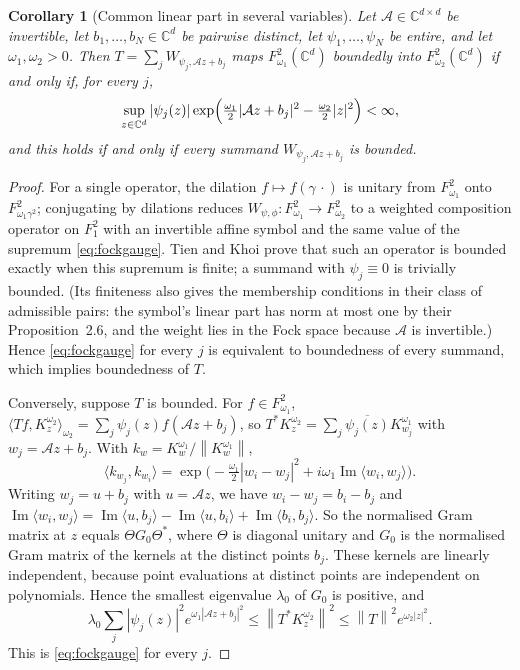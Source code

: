 \documentclass[11pt,a4paper]{article}
\newtheorem{corollary}[theorem]{Corollary}
\theoremstyle{remark}
\newcommand{\C}{\mathbb C}
\newcommand{\norm}[1]{\left\lVert#1\right\rVert}
\newcommand{\im}{\operatorname{Im}}
\begin{document}
\begin{corollary}[Common linear part in several variables]\label{cor:fock}
Let $\mathcal A\in\C^{d\times d}$ be invertible, let $b_1,\dots,b_N\in\C^d$ be
pairwise distinct, let $\psi_1,\dots,\psi_N$ be entire, and let
$\omega_1,\omega_2>0$. Then $T=\sum_jW_{\psi_j,\mathcal Az+b_j}$ maps $F^2_{\omega_1}(\C^d)$
boundedly into $F^2_{\omega_2}(\C^d)$ if and only if, for every $j$,
\begin{equation}\label{eq:fockgauge}
 \sup_{z\in\C^d}|\psi_j(z)|
 \exp\Bigl(\tfrac{\omega_1}{2}|\mathcal Az+b_j|^2-\tfrac{\omega_2}{2}|z|^2\Bigr)<\infty,
\end{equation}
and this holds if and only if every summand $W_{\psi_j,\mathcal Az+b_j}$ is
bounded.
\end{corollary}

\begin{proof}
For a single operator, the dilation $f\mapsto f(\gamma\,\cdot)$ is
unitary from $F^2_{\omega_1}$ onto $F^2_{\omega_1\gamma^2}$; conjugating by
dilations reduces $W_{\psi,\phi}:F^2_{\omega_1}\to F^2_{\omega_2}$ to a weighted
composition operator on $F^2_1$ with an invertible affine symbol and
the same value of the supremum \eqref{eq:fockgauge}. Tien and Khoi
\cite[Corollary~3.10(a)]{TienKhoi2020} prove that such an operator is
bounded exactly when this supremum is finite; a summand with
$\psi_j\equiv0$ is trivially bounded. (Its finiteness also gives
the membership conditions in their class of admissible pairs: the
symbol's linear part has norm at most one by their Proposition~2.6, and
the weight lies in the Fock space because $\mathcal A$ is invertible.) Hence
\eqref{eq:fockgauge} for every $j$ is equivalent to boundedness of every
summand, which implies boundedness of $T$.

Conversely, suppose $T$ is bounded. For $f\in F^2_{\omega_1}$,
$\langle Tf,K^{\omega_2}_z\rangle_{\omega_2}=\sum_j\psi_j(z)f(\mathcal Az+b_j)$, so
$T^*K^{\omega_2}_z=\sum_j\overline{\psi_j(z)}K^{\omega_1}_{w_j}$ with
$w_j=\mathcal Az+b_j$. With $k_w=K^{\omega_1}_w/\norm{K^{\omega_1}_w}$,
\[
 \langle k_{w_j},k_{w_i}\rangle
 =\exp\bigl(-\tfrac{\omega_1}{2}|w_i-w_j|^2+i\omega_1\im\langle w_i,w_j\rangle\bigr).
\]
Writing $w_j=u+b_j$ with $u=\mathcal Az$, we have $w_i-w_j=b_i-b_j$ and
$\im\langle w_i,w_j\rangle=\im\langle u,b_j\rangle-\im\langle u,b_i\rangle
+\im\langle b_i,b_j\rangle$. So the normalised Gram matrix at $z$ equals
$\Theta G_0\Theta^*$, where $\Theta$ is diagonal unitary and $G_0$ is the
normalised Gram matrix of the kernels at the distinct points $b_j$.
These kernels are linearly independent, because point evaluations at
distinct points are independent on polynomials. Hence the smallest
eigenvalue $\lambda_0$ of $G_0$ is positive, and
\[
 \lambda_0\sum_j|\psi_j(z)|^2e^{\omega_1|\mathcal Az+b_j|^2}
 \le\norm{T^*K^{\omega_2}_z}^2\le\norm T^2e^{\omega_2|z|^2}.
\]
This is \eqref{eq:fockgauge} for every $j$.
\end{proof}
\end{document}
